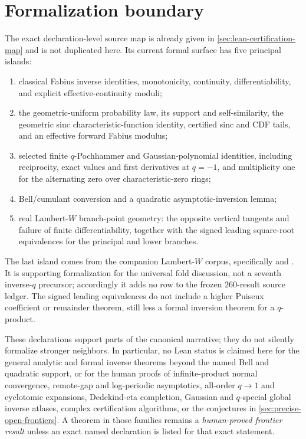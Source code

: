 \section{Formalization boundary}
\label{sec:ref-formalization-boundary}

The exact declaration-level source map is already given in
\cref{sec:lean-certification-map} and is not duplicated here.  Its current
formal surface has five principal islands:

\begin{enumerate}
\item classical Fabius inverse identities, monotonicity, continuity,
  differentiability, and explicit effective-continuity moduli;
\item the geometric-uniform probability law, its support and self-similarity,
  the geometric sinc characteristic-function identity, certified sinc and CDF
  tails, and an effective forward Fabius modulus;
\item selected finite \(q\)-Pochhammer and Gaussian-polynomial identities,
  including reciprocity, exact values and first derivatives at \(q=-1\), and
  multiplicity one for the alternating zero over characteristic-zero rings;
\item Bell/cumulant conversion and a quadratic asymptotic-inversion lemma;
\item real Lambert-\(W\) branch-point geometry: the opposite vertical
  tangents and failure of finite differentiability, together with the signed
  leading square-root equivalences for the principal and lower branches.
\end{enumerate}

The last island comes from the companion Lambert-\(W\) corpus, specifically
 and
.  It is supporting formalization
for the universal fold discussion, not a seventh inverse-\(q\) precursor;
accordingly it adds no row to the frozen \(260\)-result source ledger.  The
signed leading equivalences do not include a higher Puiseux coefficient or
remainder theorem, still less a formal inversion theorem for a
\(q\)-product.

These declarations support parts of the canonical narrative; they do not
silently formalize stronger neighbors.  In particular, no Lean status is
claimed here for the general analytic and formal inverse theorems beyond the
named Bell and quadratic support, or for the human proofs of infinite-product
normal convergence, remote-gap and log-periodic asymptotics, all-order
\(q\to1\) and cyclotomic expansions, Dedekind-eta completion, Gaussian and
\(q\)-special global inverse atlases, complex certification algorithms, or
the conjectures in
\cref{sec:precise-open-frontiers}.  A theorem in those families remains a
\emph{human-proved frontier result} unless an exact named declaration is
listed for that exact statement.

